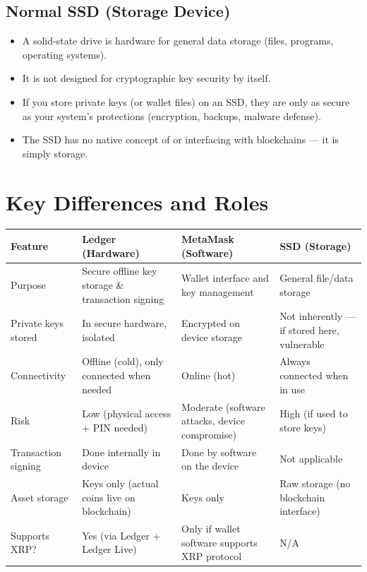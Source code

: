 \documentclass{article}
\begin{document}
\subsection*{Normal SSD (Storage Device)}
\begin{itemize}
  \item A solid-state drive is hardware for general data storage (files, programs, operating systems).  
  \item It is not designed for cryptographic key security by itself.  
  \item If you store private keys (or wallet files) on an SSD, they are only as secure as your system's protections (encryption, backups, malware defense).  
  \item The SSD has no native concept of  or interfacing with blockchains — it is simply storage.
\end{itemize}

\section{Key Differences and Roles}

\begin{tabular}{|l|l|l|l|}
\hline
Feature & Ledger (Hardware) & MetaMask (Software) & SSD (Storage) \\
\hline
Purpose & Secure offline key storage \& transaction signing & Wallet interface and key management & General file/data storage \\
\hline
Private keys stored & In secure hardware, isolated & Encrypted on device storage & Not inherently — if stored here, vulnerable \\
\hline
Connectivity & Offline (cold), only connected when needed & Online (hot) & Always connected when in use \\
\hline
Risk & Low (physical access + PIN needed) & Moderate (software attacks, device compromise) & High (if used to store keys) \\
\hline
Transaction signing & Done internally in device & Done by software on the device & Not applicable \\
\hline
Asset storage & Keys only (actual coins live on blockchain) & Keys only & Raw storage (no blockchain interface) \\
\hline
Supports XRP? & Yes (via Ledger + Ledger Live) & Only if wallet software supports XRP protocol & N/A \\
\hline
\end{tabular}
\end{document}
